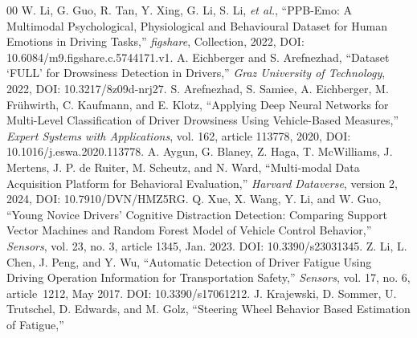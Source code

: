 \documentclass[letterpaper, 10 pt, conference]{ieeeconf}  %
\begin{document}
\begin{thebibliography}{00}
 W. Li, G. Guo, R. Tan, Y. Xing, G. Li, S. Li, \textit{et al.},  
    ``PPB-Emo: A Multimodal Psychological, Physiological and Behavioural Dataset for Human Emotions in Driving Tasks,''  
    \textit{figshare}, Collection, 2022, DOI: 10.6084/m9.figshare.c.5744171.v1. 
 A. Eichberger and S. Arefnezhad,  
    ``Dataset `FULL' for Drowsiness Detection in Drivers,'' 
    \textit{Graz University of Technology}, 2022, DOI: 10.3217/8z09d-nrj27. 
 S. Arefnezhad, S. Samiee, A. Eichberger, M. Frühwirth, C. Kaufmann, and E. Klotz,  
    ``Applying Deep Neural Networks for Multi-Level Classification of Driver Drowsiness Using Vehicle-Based Measures,''  
    \textit{Expert Systems with Applications}, vol. 162, article 113778, 2020, DOI: 10.1016/j.eswa.2020.113778.
 A. Aygun, G. Blaney, Z. Haga, T. McWilliams, J. Mertens, J. P. de Ruiter, M. Scheutz, and N. Ward, 
    ``Multi-modal Data Acquisition Platform for Behavioral Evaluation,''  
    \textit{Harvard Dataverse}, version 2, 2024, DOI: 10.7910/DVN/HMZ5RG. 
 Q. Xue, X. Wang, Y. Li, and W. Guo,  
    ``Young Novice Drivers’ Cognitive Distraction Detection: Comparing Support Vector Machines and Random Forest Model of Vehicle Control Behavior,''  
    \textit{Sensors}, vol. 23, no. 3, article 1345, Jan. 2023. DOI: 10.3390/s23031345.
 Z. Li, L. Chen, J. Peng, and Y. Wu,  
    ``Automatic Detection of Driver Fatigue Using Driving Operation Information for Transportation Safety,''  
    \textit{Sensors}, vol. 17, no. 6, article~1212, May 2017. DOI: 10.3390/s17061212.
 J. Krajewski, D. Sommer, U. Trutschel, D. Edwards, and M. Golz,  
    ``Steering Wheel Behavior Based Estimation of Fatigue,''  

\end{thebibliography}
\end{document}
